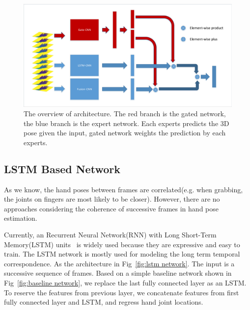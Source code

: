 \documentclass[journal,comsoc]{IEEEtran}
\let\MYoriglatexcaption\caption
\renewcommand{\caption}[2][\relax]{\MYoriglatexcaption[#2]{#2}}
\begin{document}
\begin{figure}[t]
    \centering
    \includegraphics[width=1\linewidth]{src/network/architecture.pdf}
    \caption{The overview of architecture. The red branch is the gated network, the blue branch is the expert network. 
    Each experts predicts the 3D pose given the input, gated network weights the prediction by each experts.}
\label{fig:architecture}
\end{figure}

\subsection{LSTM Based Network}\label{sec:lstm netowork}
As we know, the hand poses between frames are correlated(e.g. when grabbing, the joints on fingers are most likely to be closer). 
However, there are no approaches considering the coherence of successive frames in hand pose estimation.

Currently, an Recurrent Neural Network(RNN) with Long Short-Term Memory(LSTM) units~\cite{zaremba2014learning} is widely used 
because they are expressive and easy to train. The LSTM network is mostly used for modeling the long term temporal correspondence. 
As the architecture in Fig~\ref{fig:lstm network}. The input is a successive sequence of frames. 
Based on a simple baseline network shown in Fig~\ref{fig:baseline network}, we replace the last fully connected layer as an LSTM. 
To reserve the features from previous layer, we concatenate features from first fully connected layer and LSTM, and regress hand joint locations.
\end{document}
